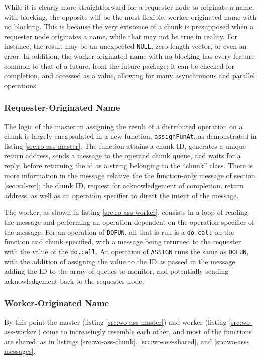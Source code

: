 \documentclass[a4paper,10pt]{article}
\begin{document}
While it is clearly more straightforward for a requester node to originate a
name, with blocking, the opposite will be the most flexible; worker-originated
name with no blocking.
This is because the very existence of a chunk is presupposed when a requester
node originates a name, while that may not be true in reality.
For instance, the result may be an unexpected \texttt{NULL}, zero-length
vector, or even an error.
In addition, the worker-originated name with no blocking has every feature
common to that of a future, from the future package; it can be checked for
completion, and accessed as a value, allowing for many asynchronous and
parallel operations.

\subsubsection{Requester-Originated Name}

The logic of the master in assigning the result of a distributed operation on a
chunk is largely encapsulated in a new function, \texttt{assignFunAt}, as
demonstrated in listing \ref{src:ro-ass-master}.
The function attains a chunk ID, generates a unique return address, sends a
message to the operand chunk queue, and waits for a reply, before returning the
id as a string belonging to the ``chunk'' class.
There is more information in the message relative the the function-only
message of section \ref{sec:val-ret}; the chunk ID, request for acknowledgement
of completion, return address, as well as an operation specifier to direct the
intent of the message.

The worker, as shown in listing \ref{src:ro-ass-worker}, consists in a loop of
reading the message and performing an operation dependent on the operation
specifier of the message.
For an operation of \texttt{DOFUN}, all that is run is a \texttt{do.call} on
the function and chunk specified, with a message being returned to the
requester with the value of the \texttt{do.call}.
An operation of \texttt{ASSIGN} runs the same as \texttt{DOFUN}, with the
addition of assigning the value to the ID as passed in the message, adding
the ID to the array of queues to monitor, and potentially sending
acknowledgement back to the requester node.

\subsubsection{Worker-Originated Name}

By this point the master (listing \ref{src:wo-ass-master}) and worker (listing
\ref{src:wo-ass-worker}) come to increasingly resemble each other, and most of
the functions are shared, as in listings \ref{src:wo-ass-chunk},
\ref{src:wo-ass-shared}, and \ref{src:wo-ass-messages}.
\end{document}
